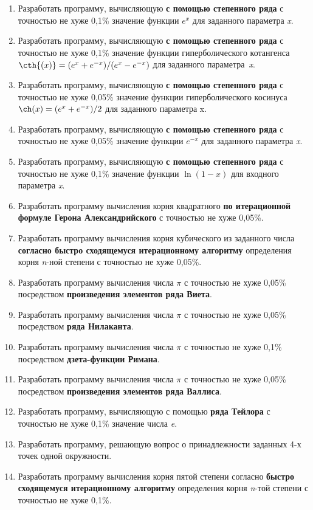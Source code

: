 \documentclass[a4paper, 12pt, oneside]{article}
\begin{document}
\begin{enumerate}
	\item Разработать программу, вычисляющую \textbf{с помощью степенного ряда} с точностью не хуже 0,1\%  значение функции $e^x$ для  заданного параметра \textit{x}.
    \item Разработать программу, вычисляющую \textbf{с помощью степенного ряда} с точностью не хуже 0,1\% значение функции гиперболического котангенса $\cth{(x)}=(e^x+e^{-x})/(e^x-e^{-x})$ для  заданного параметра~\textit{x}.
    \item Разработать программу, вычисляющую \textbf{с помощью степенного ряда} с точностью не хуже 0,05\% значение функции гиперболического косинуса $\ch(x)=(e^x+e^{-x})/2$ для  заданного параметра x.
    \item Разработать программу, вычисляющую \textbf{с помощью степенного ряда} с точностью не хуже 0,05\% значение функции $e^{-x}$ для  заданного параметра \textit{x}.
	\item Разработать программу, вычисляющую \textbf{с помощью степенного ряда} с точностью не хуже 0,1\% значение функции $\ln{(1-x)}$ для  входного параметра \textit{x}.
    \item Разработать программу вычисления корня квадратного \textbf{по итерационной формуле Герона Александрийского} с точностью не хуже 0,05\%.
	\item Разработать программу вычисления корня кубического из заданного числа \textbf{согласно быстро сходящемуся итерационному алгоритму} определения корня \textit{n}-ной степени с точностью не хуже 0,05\%.
    \item Разработать программу вычисления числа $\pi$ с точностью не хуже 0,05\% посредством \textbf{произведения элементов ряда Виета}.
    \item Разработать программу вычисления числа $\pi$ с точностью не хуже 0,05\% посредством \textbf{ряда Нилаканта}.
    \item Разработать программу вычисления числа $\pi$ с точностью не хуже 0,1\% посредством \textbf{дзета-функции Римана}.
    \item Разработать программу вычисления числа $\pi$ с точностью не хуже 0,05\% посредством \textbf{произведения элементов ряда Валлиса}.
    \item Разработать программу, вычисляющую с помощью  \textbf{ряда Тейлора} с точностью не хуже 0,1\% значение числа \textit{e}.
    \item Разработать программу, решающую вопрос о принадлежности заданных 4-х точек одной окружности.
    \item Разработать программу вычисления корня пятой степени согласно \textbf{быстро сходящемуся итерационному алгоритму} определения корня \textit{n}-той степени с точностью не хуже 0,1\%.

\end{enumerate}
\end{document}
